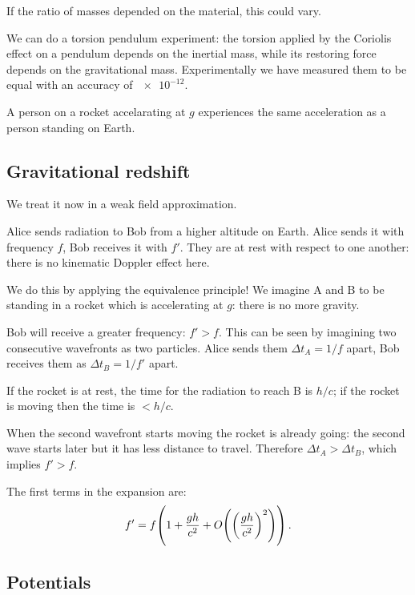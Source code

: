 \documentclass[main.tex]{subfiles}
\begin{document}
If the ratio of masses depended on the material, this could vary.

We can do a torsion pendulum experiment: the torsion applied by the Coriolis effect on a pendulum depends on the inertial mass, while its restoring force depends on the gravitational mass.
Experimentally we have measured them to be equal with an accuracy of \(\num{e-12} \).

A person on a rocket accelarating at \(g\) experiences the same acceleration as a person standing on Earth.

\subsection{Gravitational redshift}

We treat it now in a weak field approximation.


Alice sends radiation to Bob from a higher altitude on Earth. Alice sends it with frequency \(f\), Bob receives it with \(f'\). They are at rest with respect to one another: there is no kinematic Doppler effect here.

We do this by applying the equivalence principle! We imagine A and B to be standing in a rocket which is accelerating at \(g\):
there is no more gravity.

Bob will receive a greater frequency: \(f'>f\). This can be seen by imagining two consecutive wavefronts as two particles. Alice sends them \(\Delta t_A = 1/f\) apart, Bob receives them as \(\Delta t_B=1/f'\) apart.

If the rocket is at rest, the time for the radiation to reach B is \(h/c\); if the rocket is moving then the time is \(<h/c\).

When the second wavefront starts moving the rocket is already going: the second wave starts later but it has less distance to travel. Therefore \(\Delta t_A > \Delta t_B\), which implies \(f'>f\).

\begin{claim}
    The first terms in the expansion are:
    \begin{equation}
        f' = f \qty(1+ \frac{gh}{c^2} + O \qty(\qty(\frac{gh}{c^2})^2))\,.
    \end{equation}
\end{claim}
    
\subsection{Potentials}
\end{document}
